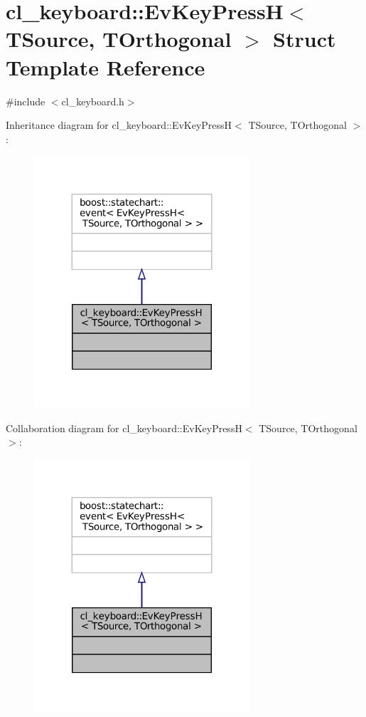 \hypertarget{structcl__keyboard_1_1EvKeyPressH}{}\section{cl\+\_\+keyboard\+:\+:Ev\+Key\+PressH$<$ T\+Source, T\+Orthogonal $>$ Struct Template Reference}
\label{structcl__keyboard_1_1EvKeyPressH}


{\ttfamily \#include $<$cl\+\_\+keyboard.\+h$>$}



Inheritance diagram for cl\+\_\+keyboard\+:\+:Ev\+Key\+PressH$<$ T\+Source, T\+Orthogonal $>$\+:
\nopagebreak
\begin{figure}[H]
\begin{center}
\leavevmode
\includegraphics[width=227pt]{structcl__keyboard_1_1EvKeyPressH__inherit__graph}
\end{center}
\end{figure}


Collaboration diagram for cl\+\_\+keyboard\+:\+:Ev\+Key\+PressH$<$ T\+Source, T\+Orthogonal $>$\+:
\nopagebreak
\begin{figure}[H]
\begin{center}
\leavevmode
\includegraphics[width=227pt]{structcl__keyboard_1_1EvKeyPressH__coll__graph}
\end{center}
\end{figure}


